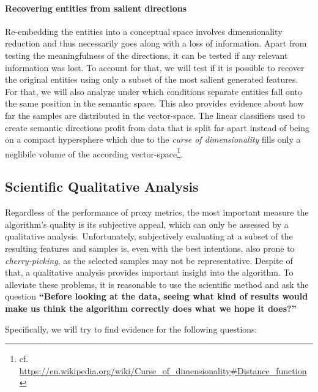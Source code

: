 \paragraph{Recovering entities from salient directions} Re-embedding the entities into a conceptual space involves dimensionality reduction and thus necessarily goes along with a loss of information. Apart from testing the meaningfulness of the directions, it can be tested if any relevant information was lost. To account for that, we will test if it is possible to recover the original entities using only a subset of the most salient generated features. For that, we will also analyze under which conditions separate entities fall onto the same position in the semantic space. This also provides evidence about how far the samples are distributed in the vector-space. The linear classifiers used to create semantic directions profit from data that is split far apart instead of being on a compact hypersphere which due to the \textit{curse of dimensionality} fills only a neglibile volume of the according vector-space\footnote{cf. \url{https://en.wikipedia.org/wiki/Curse_of_dimensionality\#Distance_function}}. 

\subsection{Scientific Qualitative Analysis}

Regardless of the performance of proxy metrics, the most important measure the algorithm's quality is its subjective appeal, which can only be assessed by a qualitative analysis. Unfortunately, subjectively evaluating at a subset of the resulting features and samples is, even with the best intentions, also prone to  \textit{cherry-picking}, as the selected samples may not be representative. Despite of that, a qualitative analysis provides important insight into the algorithm. To alleviate these problems, it is reasonable to use the scientific method and ask the question \textbf{``Before looking at the data, seeing what kind of results would make us think the algorithm correctly does what we hope it does?''}

Specifically, we will try to find evidence for the following questions:

